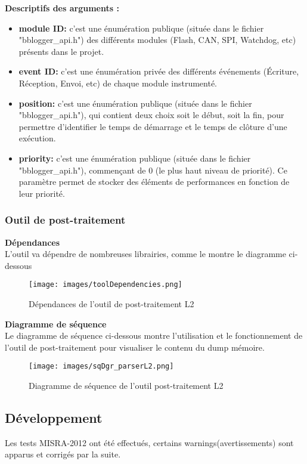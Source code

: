 \documentclass[a4paper, 12pt]{report}
\begin{document}
\clearpage
    \textbf{Descriptifs des arguments :}\\
    \begin{itemize}
        \item \textbf{module ID:} c'est une énumération publique (située dans le fichier "bblogger\_api.h") des différents modules (Flash, CAN, SPI, Watchdog, etc) présents dans le projet.
        \item \textbf{event ID:} c'est une énumération privée des différents événements (Écriture, Réception, Envoi, etc) de chaque module instrumenté.
        \item  \textbf{position:} c'est une énumération publique (située dans le fichier "bblogger\_api.h"), qui contient deux choix soit le début, soit la fin, pour permettre d'identifier le temps de démarrage et le temps de clôture d'une exécution.
        \item  \textbf{priority:} c'est une énumération publique (située dans le fichier "bblogger\_api.h"), commençant de 0 (le plus haut niveau de priorité). Ce paramètre permet de stocker des éléments de performances en fonction de leur priorité.
    \end{itemize}


    
\subsubsection{Outil de post-traitement}
\textbf{Dépendances}\\
L'outil va dépendre de nombreuses librairies, comme le montre le diagramme ci-dessous
     \begin{figure}[H]
        \centering
    \texttt{[image: images/toolDependencies.png]}
            \caption{Dépendances de l'outil de post-traitement L2}
            \label{fig:parDepL2}
    \end{figure}

\textbf{Diagramme de séquence}\\
Le diagramme de séquence ci-dessous montre l'utilisation et le fonctionnement de l'outil de post-traitement pour visualiser le contenu du dump mémoire.
     \begin{figure}[H]
            \centering
    \texttt{[image: images/sqDgr\_parserL2.png]}
            \caption{Diagramme de séquence de l'outil post-traitement L2}
            \label{fig:DegSeqParserL2}
    \end{figure}


\subsection{Développement}
 Les tests MISRA-2012 ont été effectués, certains warnings(avertissements) sont apparus et corrigés par la suite.
\end{document}
